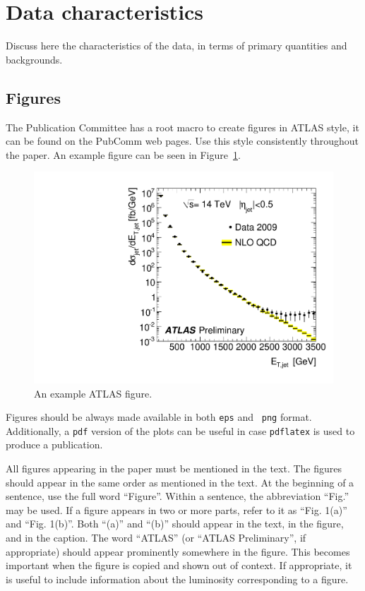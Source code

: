 \documentclass[11pt,a4paper]{../atlasnote}
\begin{document}
%
%
\section{Data characteristics}

Discuss here the characteristics of the data, in terms of
primary quantities and backgrounds.

\subsection{Figures}

The Publication Committee has a root macro to create figures in
ATLAS style, it can be found on the PubComm web pages.
Use this style consistently throughout the paper.
An example figure can be seen in Figure~\ref{fig:example}. 

\begin{figure}
  \centering
  \includegraphics[width=\columnwidth]{AtlasExample}
  \caption{An example ATLAS figure.}
  \label{fig:example}
\end{figure}

Figures should be always made available in both {\tt eps} and {\tt
  png} format. Additionally, a {\tt pdf} version of the plots can be
useful in case \verb|pdflatex| is used to produce a publication.

All figures appearing in the paper must be mentioned in the text.
The figures should appear in the same order as mentioned in the text.
At the beginning of a sentence, use the full word ``Figure''.
Within a sentence, the abbreviation ``Fig.'' may be used.
If a figure appears in two or more parts, refer to it as
``Fig. 1(a)'' and ``Fig. 1(b)''. Both ``(a)'' and ``(b)'' should
appear in the text, in the figure, and in the caption.
The word ``ATLAS'' (or ``ATLAS Preliminary'', if appropriate) should
appear prominently somewhere in the figure. This becomes important when
the figure is copied and shown out of context. If appropriate, it
is useful to include information about the luminosity corresponding
to a figure.
\end{document}
